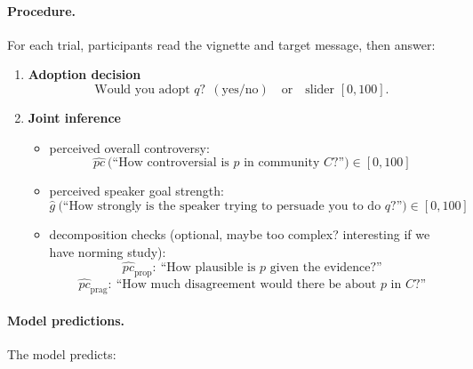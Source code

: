\documentclass[12pt]{article}
\begin{document}
\paragraph{Procedure.}
For each trial, participants read the vignette and target message, then answer:
\begin{enumerate}
\item \textbf{Adoption decision}
\[
\text{Would you adopt } q?\ \ (\text{yes/no}) \quad\text{or}\quad \text{slider }[0,100].
\]
\item \textbf{Joint inference}
\begin{itemize}
\item perceived overall controversy:
\[
\widehat{pc}\ \text{(``How controversial is $p$ in community $C$?'')} \in [0,100]
\]
\item perceived speaker goal strength:
\[
\widehat{g}\ \text{(``How strongly is the speaker trying to persuade you to do $q$?'')} \in [0,100]
\]
\item decomposition checks (optional, maybe too complex? interesting if we have norming study):
\[
\widehat{pc}_{\text{prop}}:\ \text{``How plausible is $p$ given the evidence?''}
\]
\[
\widehat{pc}_{\text{prag}}:\ \text{``How much disagreement would there be about $p$ in $C$?''}
\]
\end{itemize}
\end{enumerate}

\paragraph{Model predictions.}
The model predicts:
\end{document}
